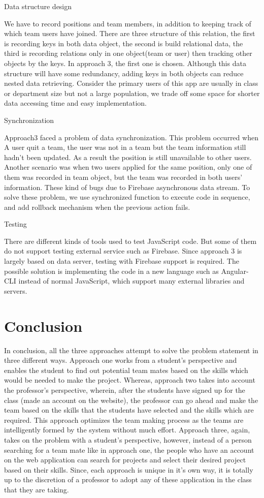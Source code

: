 \documentclass[conference]{IEEEtran}
\begin{document}
Data structure design

We have to record positions and team members, in addition to keeping track of which team users have joined. There are three structure of this relation, the first is recording keys in both data object, the second is build relational data, the third is recording relations only in one object(team or user) then tracking other objects by the keys. In approach 3, the first one is chosen. Although this data structure will have some redundancy, adding keys in both objects can reduce nested data retrieving. Consider the primary users of this app are usually in class or department size but not a large population, we trade off some space for shorter data accessing time and easy implementation.

Synchronization

Approach3 faced a problem of data synchronization. This problem occurred when A user quit a team, the user was not in a team but the team information still hadn't been updated. As a result the position is still unavailable to other users. Another scenario was when two users applied for the same position, only one of them was recorded in team object, but the team was recorded in both users' information. These kind of bugs due to Firebase asynchronous data stream. To solve these problem, we use synchronized function to execute code in sequence, and add rollback mechanism when the previous action fails.

Testing

There are different kinds of tools used to test JavaScript code. But some of them do not support testing external service such as Firebase. Since approach 3 is largely based on data server, testing with Firebase support is required. The possible solution is implementing the code in a new language such as Angular-CLI instead of normal JavaScript, which support many external libraries and servers.

\section{Conclusion}
In conclusion, all the three approaches attempt to solve the problem statement in three different ways. Approach one works from a student's perspective and enables the student to find out potential team mates based on the skills which would be needed to make the project. Whereas, approach two takes into account the professor's perspective, wherein, after the students have signed up for the class (made an account on the website), the professor can go ahead and make the team based on the skills that the students have selected and the skills which are required. This approach optimizes the team making process as the teams are intelligently formed by the system without much effort. Approach three, again, takes on the problem with a student's perspective, however, instead of a person searching for a team mate like in approach one, the people who have an account on the web application can search for projects and select their desired project based on their skills. Since, each approach is unique in it's own way, it is totally up to the discretion of a professor to adopt any of these application in the class that they are taking.
\end{document}
